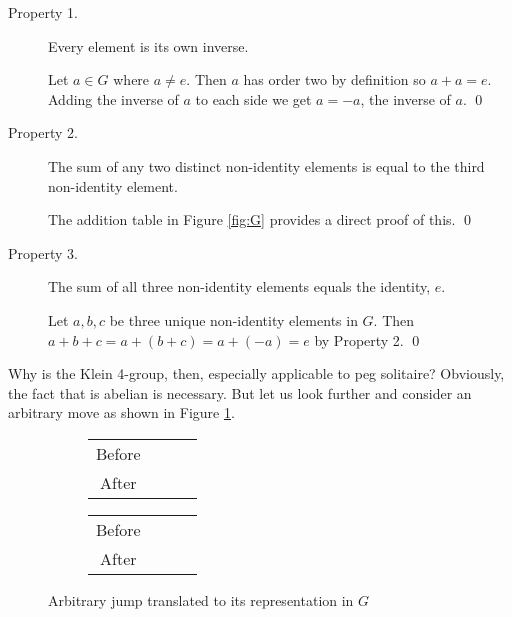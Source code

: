 \documentclass[11pt]{article}
\renewenvironment{proof}{{\noindent\bfseries Proof.}}{\qed}
\newcommand*\cir[1]{
  \begin{tikzpicture}[baseline]
    \node[draw,circle,inner sep=0pt,minimum size=12pt,anchor=center](C){#1};
  \end{tikzpicture}}
\newcommand*\h{\cir{}}
\newcommand*\p{
  \begin{tikzpicture}[baseline]
    \node[draw,circle,inner sep=0pt,minimum size=12pt,anchor=center](C){};
    \node[fill=black,circle,inner sep=0pt,minimum size=5pt,anchor=center](C){};
  \end{tikzpicture}}
\newcommand*\x{\cir{$x$}}
\newcommand*\y{\cir{$y$}}
\newcommand*\z{\cir{$z$}}
\begin{document}
\begin{description}
\item[Property 1.] Every element is its own inverse.

\begin{proof}
Let $a \in G$ where $a \neq e$. Then $a$ has order two by definition so $a + a = e$. Adding the inverse of $a$ to each side we get $a = -a$, the inverse of $a$.
\end{proof}

\item[Property 2.] The sum of any two distinct non-identity elements is equal to the third non-identity element.

\begin{proof}
The addition table in Figure \ref{fig:G} provides a direct proof of this.
\end{proof}

\item[Property 3.] The sum of all three non-identity elements equals the identity, $e$.

\begin{proof}
Let $a, b, c$ be three unique non-identity elements in $G$. Then $a + b + c = a + (b + c) = a + (-a) = e$ by Property 2.
\end{proof}

\end{description}

Why is the Klein 4-group, then, especially applicable to peg solitaire? Obviously, the fact that is abelian is necessary. But let us look further and consider an arbitrary move as shown in Figure \ref{fig:jump}.

\begin{figure}[h]
\centering
\begin{subfigure}{.4\textwidth}
\centering
\begin{tabular}{c m{3pt} m{3pt} m{3pt}}
Before & \p & \p & \h \\
After & \h & \h & \p
\end{tabular}
\end{subfigure}%
\begin{subfigure}{.4\textwidth}
\centering
\begin{tabular}{c m{3pt} m{3pt} m{3pt}}
Before & \x & \y & \h \\
After & \h & \h & \z
\end{tabular}
\end{subfigure}
\caption{Arbitrary jump translated to its representation in $G$}
\label{fig:jump}
\end{figure}
\end{document}

